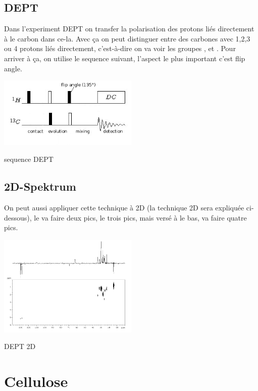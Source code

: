 \documentclass[a4paper,12pt]{scrartcl}
\begin{document}
  \subsection{DEPT }
Dans l'experiment DEPT on transfer la polarisation des protons 	 liés directement à le carbon dans ce-la. Avec \c ca on peut 	 distinguer entre des carbones avec 1,2,3 ou 4 protons liés directement, c'est-à-dire on va voir les groupes ,  et . Pour arriver à \c ca, on utilise le sequence suivant, l'aspect le plus important c'est flip angle.
\begin{figurehere}
    \center
    \includegraphics[width=0.5\textwidth]{bilder/DEPT.png}
    \caption{sequence DEPT}
   \end{figurehere}  

  \subsection{2D-Spektrum}
   On peut aussi appliquer cette technique à 2D (la technique 2D sera expliquée ci-dessous), le  va faire deux pics, le  trois pics, mais versé à le bas,  va faire quatre pics.
  \begin{figurehere}
    \center
    \includegraphics[width=0.5\textwidth]{bilder/dept_2d.png}
    \caption{DEPT 2D}
   \end{figurehere}
 

 \section{Cellulose}
\end{document}
